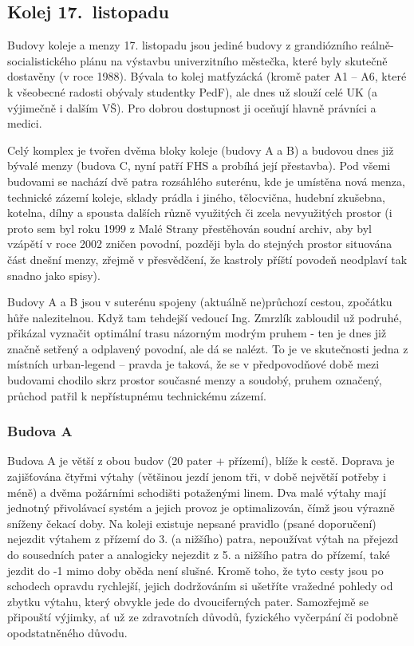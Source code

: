 \subsection{Kolej 17.~listopadu}
Budovy koleje a menzy 17. listopadu jsou jediné budovy z grandiózního
reálně-socialistického plánu na výstavbu univerzitního městečka, které byly
skutečně dostavěny (v roce 1988). Bývala to kolej matfyzácká (kromě pater A1 –
A6, které k všeobecné radosti obývaly studentky PedF), ale dnes už slouží celé
UK (a výjimečně i dalším VŠ). Pro dobrou dostupnost ji oceňují hlavně právníci a
medici.

Celý komplex je tvořen dvěma bloky koleje (budovy A a B) a budovou dnes již
bývalé menzy (budova C, nyní patří FHS a probíhá její přestavba). Pod všemi
budovami se nachází dvě patra rozsáhlého suterénu, kde je umístěna nová menza,
technické zázemí koleje, sklady prádla i jiného, tělocvična, hudební zkušebna,
kotelna, dílny a spousta dalších různě využitých či zcela nevyužitých prostor (i
proto sem byl roku 1999 z Malé Strany přestěhován soudní archiv, aby byl vzápětí
v roce 2002 zničen povodní, později byla do stejných prostor situována část
dnešní menzy, zřejmě v přesvědčení, že kastroly příští povodeň neodplaví tak
snadno jako spisy).

Budovy A a B jsou v suterénu spojeny (aktuálně ne)průchozí cestou, zpočátku hůře
nalezitelnou. Když tam tehdejší vedoucí Ing. Zmrzlík zabloudil už podruhé,
přikázal vyznačit optimální trasu názorným modrým pruhem - ten je dnes již
značně setřený a odplavený povodní, ale dá se nalézt. To je ve skutečnosti jedna
z místních urban-legend – pravda je taková, že se v předpovodňové době mezi
budovami chodilo skrz prostor současné menzy a soudobý, pruhem označený, průchod
patřil k nepřístupnému technickému zázemí.


\subsubsection{Budova A}
Budova A je větší z obou budov (20 pater + přízemí), blíže k cestě. Doprava je
zajišťována čtyřmi výtahy (většinou jezdí jenom tři, v době největší potřeby i
méně) a dvěma požárními schodišti potaženými linem. Dva malé výtahy mají
jednotný přivolávací systém a jejich provoz je optimalizován, čímž jsou výrazně
sníženy čekací doby. Na koleji existuje nepsané pravidlo (psané doporučení)
nejezdit výtahem z přízemí do 3. (a nižšího) patra, nepoužívat výtah na přejezd
do sousedních pater a analogicky nejezdit z 5. a nižšího patra do přízemí, také
jezdit do -1 mimo doby oběda není slušné. Kromě toho, že tyto cesty jsou po
schodech opravdu rychlejší, jejich dodržováním si ušetříte vražedné pohledy od
zbytku výtahu, který obvykle jede do dvouciferných pater. Samozřejmě se
připouští výjimky, ať už ze zdravotních důvodů, fyzického vyčerpání či podobně
opodstatněného důvodu.

